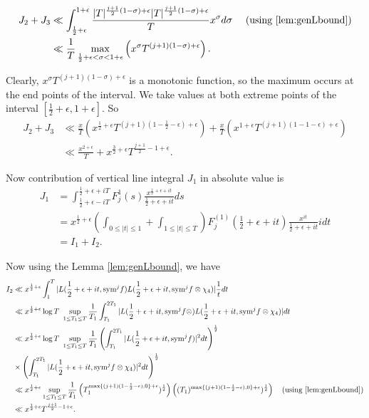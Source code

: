 \documentclass[10pt]{amsart}
\begin{document}
\begin{align*}
    J_2+J_3 &\ll \int_{\frac{1}{2}+\epsilon}^{1+\epsilon} \frac{|T|^{\frac{j+1}{2}(1-\sigma)+\epsilon}|T|^{\frac{j+1}{2}(1-\sigma)+\epsilon}}{T}x^{\sigma}d\sigma \quad \text{ (using \ref{lem:genLbound})} \\
    &\ll \frac{1}{T} \max_{\frac{1}{2}+\epsilon < \sigma < 1+\epsilon} \left( x^\sigma T^{(j+1)(1-\sigma)+\epsilon}\right) .
\end{align*}

Clearly, $x^\sigma T^{(j+1)(1-\sigma)+\epsilon}$ is a monotonic function, so the maximum occurs at the end points of the interval. We take values at both extreme points of the interval $[\frac{1}{2}+\epsilon, 1+\epsilon]$. So 
\begin{align*}
    J_2+J_3 &\ll \frac{x}{T}\left( x^{\frac{1}{2}+\epsilon}T^{(j+1) (1-\frac{1}{2}-\epsilon) +\epsilon} \right) +  \frac{x}{T}\left( x^{1+\epsilon}T^{(j+1) (1-1-\epsilon) +\epsilon}
    \right) \\
    &\ll \frac{x^{2+\epsilon}}{T}+x^{\frac{3}{2}+\epsilon}T^{\frac{j+1}{2}-1+\epsilon}.
\end{align*}

Now contribution of vertical line integral $J_1$ in absolute value is 
\begin{align*}
    J_1 &= \int_{\frac{1}{2}+\epsilon - iT}^{\frac{1}{2}+\epsilon+iT}F_j^1(s) \frac{x^{\frac{1}{2}+\epsilon+it}}{\frac{1}{2}+\epsilon+it}ds \\
    &= x^{\frac{1}{2}+\epsilon}\left( \int_{0\leq |t|\leq 1} + \int_{1 \leq |t| \leq T} \right)F_j^{(1)}\left(\frac{1}{2}+\epsilon+it\right) \frac{x^{it}}{\frac{1}{2}+\epsilon+it}idt\\
    &= I_1+I_2.
\end{align*}

Now using the Lemma \ref{lem:genLbound}, we have
\begin{align*}
    I_2 &\ll x^{\frac{1}{2}+\epsilon} \int_{1}^{T}|L(\frac{1}{2}+\epsilon+it, \mathrm{sym}^j f) L(\frac{1}{2}+\epsilon+it, \mathrm{sym}^j f \otimes \chi_4)| \frac{1}{t} dt \\
    &\ll x^{\frac{1}{2}+\epsilon} \log T\text{ }\sup_{1 \leq T_1 \leq T}\frac{1}{T_1}\int_{T_1}^{2T_1}|L(\frac{1}{2}+\epsilon+it, \mathrm{sym}^j f \otimes ) L(\frac{1}{2}+\epsilon+it, \mathrm{sym}^j f \otimes \chi_4)| dt \\
    & \ll x^{\frac{1}{2}+\epsilon}\log T\text{ }\sup_{1 \leq T_1 \leq T}\frac{1}{T_1} \left( \int_{T_1}^{2T_1}|L(\frac{1}{2}+\epsilon+it, \mathrm{sym}^j f)|^2 dt \right)^{\frac{1}{2}} \\
    & \times\left( \int_{T_1}^{2T_1} |L(\frac{1}{2}+\epsilon+it, \mathrm{sym}^j f\otimes \chi_4)|^2 dt \right)^{\frac{1}{2}} \\
    & \ll x^{\frac{1}{2}+\epsilon} \sup_{1 \leq T_1 \leq T}\frac{1}{T_1}\left(T_1^{\max\{(j+1)(1-\frac{1}{2}-\epsilon), 0\} + \epsilon})^{\frac{1}{2}}\right)\left((T_1)^{\max\{(j+1)(1-\frac{1}{2}-\epsilon), 0\} + \epsilon})^{\frac{1}{2}}\right) \quad \text{(using \ref{lem:genLbound})} \\
    & \ll x^{\frac{1}{2}+\epsilon}T^{\frac{j+1}{2}-1+\epsilon}.
\end{align*}
\end{document}
